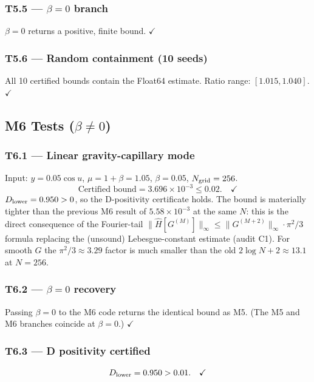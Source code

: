 \documentclass[11pt]{article}
\theoremstyle{definition}
\begin{document}
\subsubsection*{T5.5 --- $\beta=0$ branch}
$\beta=0$ returns a positive, finite bound. $\checkmark$

\subsubsection*{T5.6 --- Random containment (10 seeds)}
All 10 certified bounds contain the Float64 estimate.
Ratio range: $[1.015, 1.040]$. $\checkmark$

\subsection{M6 Tests (\texorpdfstring{$\beta\neq 0$}{beta neq 0})}

\subsubsection*{T6.1 --- Linear gravity-capillary mode}
Input: $y = 0.05\cos u$, $\mu = 1+\beta = 1.05$, $\beta=0.05$, $N_{\rm grid}=256$.
\[
  \text{Certified bound} = 3.696\times10^{-3} \leq 0.02. \quad \checkmark
\]
$D_{\rm lower} = 0.950 > 0$, so the D-positivity certificate holds.
The bound is materially tighter than the previous M6 result of
$5.58\times10^{-3}$ at the same $N$: this is the direct consequence of the
Fourier-tail $\|\hat H[G^{(M)}]\|_\infty \le \|G^{(M+2)}\|_\infty \cdot \pi^2/3$
formula replacing the (unsound) Lebesgue-constant estimate (audit C1).
For smooth $G$ the $\pi^2/3 \approx 3.29$ factor is much smaller than the
old $2\log N + 2 \approx 13.1$ at $N=256$.

\subsubsection*{T6.2 --- $\beta=0$ recovery}
Passing $\beta=0$ to the M6 code returns the identical bound as M5.
(The M5 and M6 branches coincide at $\beta=0$.) $\checkmark$

\subsubsection*{T6.3 --- D positivity certified}
\[
  D_{\rm lower} = 0.950 > 0.01. \quad \checkmark
\]
\end{document}
